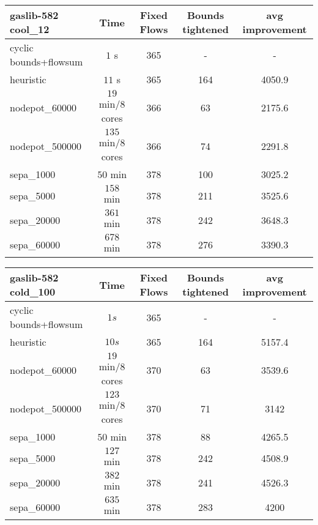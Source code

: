\begin{center}
\begin{tabular}{ l | c | c | c | c }

\textbf{gaslib-582 cool\_12} & Time  & Fixed Flows & Bounds tightened & avg improvement\\
\hline
 cyclic bounds+flowsum& $1$ s & 365 & - & - \\
 heuristic& $11$ s & 365 & 164 & 4050.9 \\
 nodepot\_60000& $19$ min/8 cores & 366 & 63 &  2175.6 \\ 
 nodepot\_500000& $135$ min/8 cores & 366 & 74 & 2291.8  \\ 
 sepa\_1000& $ 50$ min  & 378 & 100 & 3025.2\\
 sepa\_5000& $ 158$ min & 378 & 211 & 3525.6\\ 
 sepa\_20000& $ 361$ min & 378 & 242 & 3648.3  \\
 sepa\_60000& $678$ min  & 378 & 276 & 3390.3 \\
\end{tabular} 
\end{center}

\begin{center}
\begin{tabular}{ l | c | c | c | c }

\textbf{gaslib-582 cold\_100} & Time  & Fixed Flows & Bounds tightened & avg improvement\\
\hline
 cyclic bounds+flowsum& $1s$ & 365 & - & -  \\
 heuristic& $ 10s $& 365& 164 & 5157.4\\
 nodepot\_60000& $19$ min/8 cores & 370 & 63 & 3539.6  \\ 
 nodepot\_500000& $123$ min/8 cores & 370 & 71 & 3142  \\ 
 sepa\_1000& $50$ min  & 378 & 88 & 4265.5 \\
 sepa\_5000& $ 127$ min & 378 & 242 & 4508.9  \\
 sepa\_20000& $ 382$ min &  378& 241 & 4526.3  \\
 sepa\_60000& $635$ min  & 378& 283& 4200\\
\end{tabular} 
\end{center}

